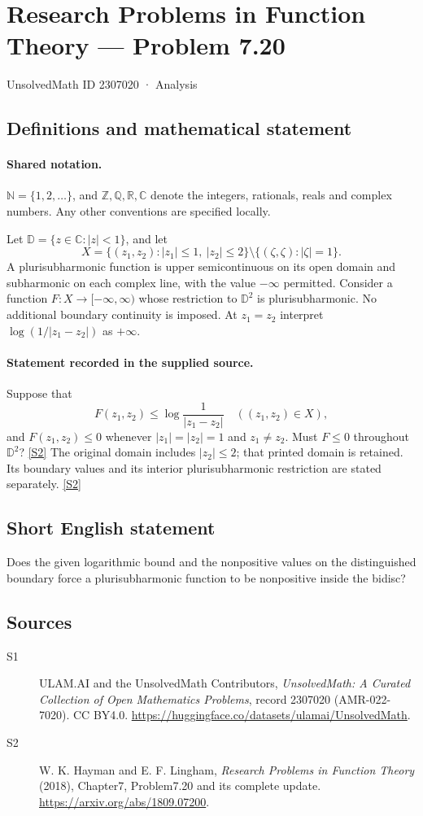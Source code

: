 \documentclass[11pt]{article}
\newcommand{\sref}[2]{\hyperlink{source:#1:#2}{[S#2]}}
\begin{document}
\setcounter{section}{2307019}
\section{Research Problems in Function Theory — Problem 7.20}\label{2307020}
{\small\sffamily UnsolvedMath ID 2307020 · Analysis}
\subsection{Definitions and mathematical statement}

\paragraph{Shared notation.}$\mathbb N=\{1,2,\ldots\}$, and $\mathbb Z,\mathbb Q,\mathbb R,\mathbb C$ denote the integers, rationals, reals and complex numbers. Any other conventions are specified locally.


Let $\mathbb D=\{z\in\mathbb C:|z|<1\}$, and let
\[X=\{(z_1,z_2):|z_1|\le1,\ |z_2|\le2\}\setminus\{(\zeta,\zeta):|\zeta|=1\}.
\]
A plurisubharmonic function is upper semicontinuous on its open domain and subharmonic on each complex line, with the value $-\infty$ permitted. Consider a function $F:X\to[-\infty,\infty)$ whose restriction to $\mathbb D^2$ is plurisubharmonic. No additional boundary continuity is imposed. At $z_1=z_2$ interpret $\log(1/|z_1-z_2|)$ as $+\infty$.

\paragraph{Statement recorded in the supplied source.}
Suppose that
\[F(z_1,z_2)\le\log\frac1{|z_1-z_2|}\quad((z_1,z_2)\in X),\]
and $F(z_1,z_2)\le0$ whenever $|z_1|=|z_2|=1$ and $z_1\ne z_2$. Must $F\le0$ throughout $\mathbb D^2$? \sref{2307020}{2}
The original domain includes $|z_2|\le2$; that printed domain is retained. Its boundary values and its interior plurisubharmonic restriction are stated separately. \sref{2307020}{2}
\subsection{Short English statement}
Does the given logarithmic bound and the nonpositive values on the distinguished boundary force a plurisubharmonic function to be nonpositive inside the bidisc?
\subsection{Sources}
\begin{description}
\item[\hypertarget{source:2307020:1}{S1}] ULAM.AI and the UnsolvedMath Contributors, \emph{UnsolvedMath: A Curated Collection of Open Mathematics Problems}, record 2307020 (AMR-022-7020). CC BY4.0. \url{https://huggingface.co/datasets/ulamai/UnsolvedMath}.
\item[\hypertarget{source:2307020:2}{S2}] W. K. Hayman and E. F. Lingham, \emph{Research Problems in Function Theory} (2018), Chapter7, Problem7.20 and its complete update. \url{https://arxiv.org/abs/1809.07200}.
\end{description}
\label{end:2307020}
\end{document}
